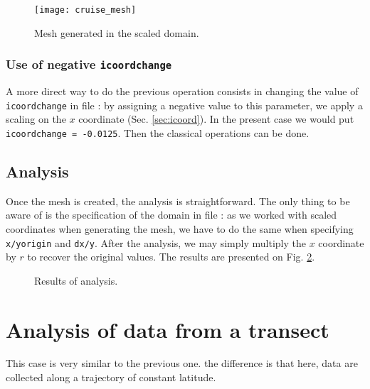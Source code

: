 \begin{figure}[H]
\centering
\texttt{[image: cruise\_mesh]}
\caption{Mesh generated in the scaled domain.\label{fig:mesh}}
\end{figure}

\subsubsection{Use of negative \texttt{icoordchange}}

A more direct way to do the previous operation consists in changing the value of \texttt{icoord\-change} in file : by assigning a negative value to this parameter, we apply a scaling on the $x$ coordinate (Sec. \ref{sec:icoord}). In the present case we would put\, \texttt{icoordchange = -0.0125}. Then the classical \diva operations can be done.



\subsection{Analysis}

Once the mesh is created, the analysis is straightforward. The only thing to be aware of is the specification of the domain in file : as we worked with scaled coordinates when generating the mesh, we have to do the same when specifying \texttt{x/yorigin} and \texttt{dx/y}. After the analysis, we may simply multiply the $x$ coordinate by $r$ to recover the original values. The results are presented on Fig. \ref{fig:analysis}.  

 
\begin{figure}[htpb]
\centering
{}
\caption{Results of analysis.\label{fig:analysis}}
\end{figure}





\section{Analysis of data from a transect}

This case is very similar to the previous one. the difference is that here, data are collected along a trajectory of constant latitude.
